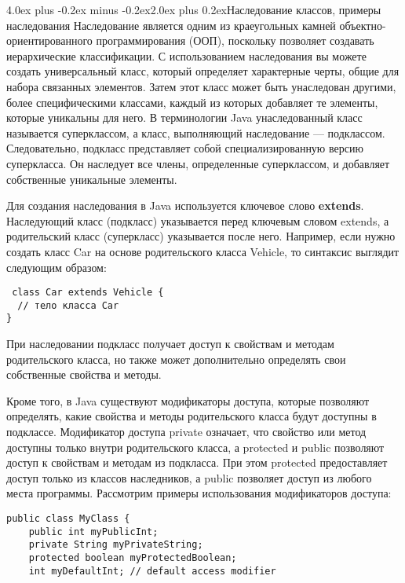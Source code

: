 \documentclass[12pt, a4paper]{book}%
\makeatletter
\renewcommand{\section}{\@startsection{section}{1}{1pt}%
{4.0ex plus -0.2ex minus -0.2ex}{2.0ex plus 0.2ex}{\centering\bf}}%
\makeatother
\begin{document}
{\section{Наследование классов, примеры наследования}
Наследование является одним из краеугольных камней объектно-ориентированного программирования (ООП), поскольку позволяет создавать иерархические классификации. С использованием наследования вы можете создать универсальный класс, который определяет характерные черты, общие для набора связанных элементов. Затем этот класс может быть унаследован другими, более специфическими классами, каждый из которых добавляет те элементы, которые уникальны для него. В терминологии Java унаследованный класс называется суперклассом, а класс, выполняющий наследование — подклассом. Следовательно, подкласс представляет собой специализированную версию суперкласса. Он наследует все члены, определенные суперклассом, и добавляет собственные уникальные элементы.

Для создания наследования в Java используется ключевое слово {\bf extends}. Наследующий класс (подкласс) указывается перед ключевым словом extends, а родительский класс (суперкласс) указывается после него. Например, если нужно создать класс Car на основе родительского класса Vehicle, то синтаксис выглядит следующим образом:

\begin{lstlisting}
 class Car extends Vehicle {
  // тело класса Car
}
\end{lstlisting}

При наследовании подкласс получает доступ к свойствам и методам родительского класса, но также может дополнительно определять свои собственные свойства и методы.

Кроме того, в Java существуют модификаторы доступа, которые позволяют определять, какие свойства и методы родительского класса будут доступны в подклассе. Модификатор доступа private означает, что свойство или метод доступны только внутри родительского класса, а protected и public позволяют доступ к свойствам и методам из подкласса. При этом protected предоставляет доступ только из классов наследников, а public позволяет доступ из любого места программы.
Рассмотрим примеры использования модификаторов доступа:

\begin{lstlisting}
public class MyClass {
    public int myPublicInt;
    private String myPrivateString;
    protected boolean myProtectedBoolean;
    int myDefaultInt; // default access modifier


\end{lstlisting}}
\end{document}
